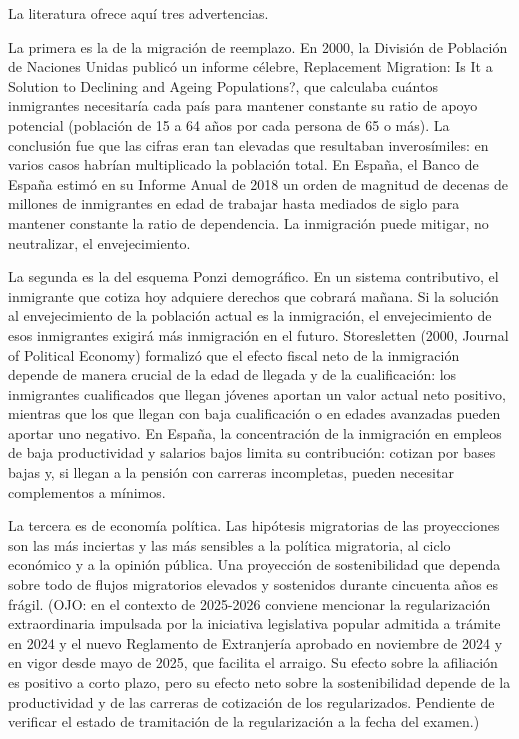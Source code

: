 \documentclass[10pt,a4paper]{article}
\begin{document}
La literatura ofrece aquí tres advertencias.

La primera es la de la migración de reemplazo. En 2000, la División de Población de Naciones Unidas publicó un informe célebre, Replacement Migration: Is It a Solution to Declining and Ageing Populations?, que calculaba cuántos inmigrantes necesitaría cada país para mantener constante su ratio de apoyo potencial (población de 15 a 64 años por cada persona de 65 o más). La conclusión fue que las cifras eran tan elevadas que resultaban inverosímiles: en varios casos habrían multiplicado la población total. En España, el Banco de España estimó en su Informe Anual de 2018 un orden de magnitud de decenas de millones de inmigrantes en edad de trabajar hasta mediados de siglo para mantener constante la ratio de dependencia. La inmigración puede mitigar, no neutralizar, el envejecimiento.

La segunda es la del esquema Ponzi demográfico. En un sistema contributivo, el inmigrante que cotiza hoy adquiere derechos que cobrará mañana. Si la solución al envejecimiento de la población actual es la inmigración, el envejecimiento de esos inmigrantes exigirá más inmigración en el futuro. Storesletten (2000, Journal of Political Economy) formalizó que el efecto fiscal neto de la inmigración depende de manera crucial de la edad de llegada y de la cualificación: los inmigrantes cualificados que llegan jóvenes aportan un valor actual neto positivo, mientras que los que llegan con baja cualificación o en edades avanzadas pueden aportar uno negativo. En España, la concentración de la inmigración en empleos de baja productividad y salarios bajos limita su contribución: cotizan por bases bajas y, si llegan a la pensión con carreras incompletas, pueden necesitar complementos a mínimos.

La tercera es de economía política. Las hipótesis migratorias de las proyecciones son las más inciertas y las más sensibles a la política migratoria, al ciclo económico y a la opinión pública. Una proyección de sostenibilidad que dependa sobre todo de flujos migratorios elevados y sostenidos durante cincuenta años es frágil. (OJO: en el contexto de 2025-2026 conviene mencionar la regularización extraordinaria impulsada por la iniciativa legislativa popular admitida a trámite en 2024 y el nuevo Reglamento de Extranjería aprobado en noviembre de 2024 y en vigor desde mayo de 2025, que facilita el arraigo. Su efecto sobre la afiliación es positivo a corto plazo, pero su efecto neto sobre la sostenibilidad depende de la productividad y de las carreras de cotización de los regularizados. Pendiente de verificar el estado de tramitación de la regularización a la fecha del examen.)
\end{document}
